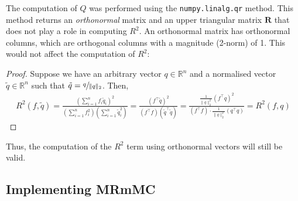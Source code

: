 \documentclass[12pt, twoside, a4paper]{report}
\begin{document}
The computation of $Q$ was performed using the \texttt{numpy.linalg.qr} method. This method returns an \textit{orthonormal} matrix and an upper triangular matrix $\boldsymbol R$ that does not play a role in computing $R^2$. An orthonormal matrix has orthonormal columns, which are orthogonal columns with a magnitude (2-norm) of 1. This would not affect the computation of $R^2$:


\begin{proof}
Suppose we have an arbitrary vector $q \in \mathbb{R}^n$ and a normalised vector $\tilde{q} \in \mathbb{R}^n$ such that $\tilde{q} = \sfrac{q}{\| q \|_2}$. Then,
\begin{align*}
R^2(f, \tilde{q}) = \frac{\left( \sum_{i=1}^n f_i \tilde{q}_i \right)^2}{\left(\sum_{i=1}^n f_i^2 \right) \left( \sum_{i=1}^n \tilde{q}_i^2 \right)}
= \frac{\left( f^\top \tilde{q} \right)^2}{(f^\top f)(\tilde{q}^\top \tilde{q})}
= \frac{\frac{1}{\| q \|^2_2} \left( f^\top q \right)^2}{(f^\top f) \cdot \frac{1}{\| q \|^2_2} \left( q^\top q \right)} = R^2(f, q)
\end{align*}
\end{proof}

Thus, the computation of the $R^2$ term using orthonormal vectors will still be valid.

\subsection{Implementing MRmMC}
\end{document}
